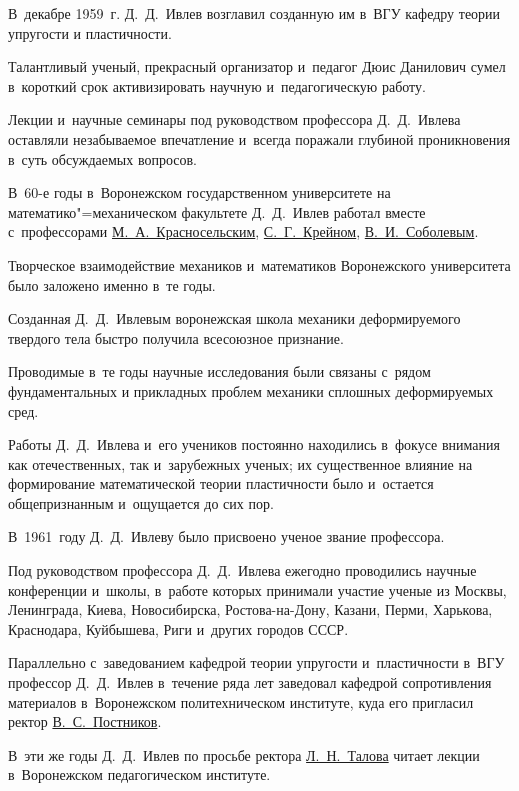 В~декабре 1959~г. Д.~Д.~Ивлев возглавил созданную им в~ВГУ кафедру теории упругости и пластичности. 

Талантливый ученый, прекрасный организатор и~педагог Дюис Данилович сумел в~короткий срок активизировать научную и~педагогическую работу. 

Лекции и~научные семинары под руководством профессора Д.~Д.~Ивлева оставляли незабываемое впечатление и~всегда поражали глубиной проникновения в~суть обсуждаемых вопросов. 

В~60-е годы в~Воронежском государственном университете на математико"=механическом факультете Д.~Д.~Ивлев работал вместе с~профессорами \href{https://goo.gl/gmkFPO}{М.~А.~Красносельским}, \href{https://goo.gl/ZUJ4FA}{С.~Г.~Крейном}, \href{https://goo.gl/JwF5q2}{В.~И.~Соболевым}. 

Творческое взаимодействие механиков и~математиков Воронежского университета было заложено именно в~те годы. 

Созданная Д.~Д.~Ивлевым воронежская школа механики деформируемого твердого тела быстро получила всесоюзное признание. 

Проводимые в~те годы научные исследования были связаны с~рядом фундаментальных и прикладных проблем механики сплошных деформируемых сред. 

Работы Д.~Д.~Ивлева и~его учеников постоянно находились в~фокусе внимания  как отечественных, так и~зарубежных ученых; их существенное влияние на формирование математической теории пластичности было и~остается общепризнанным и~ощущается до сих пор. 

В~1961~году Д.~Д.~Ивлеву было присвоено ученое звание профессора. 

Под руководством профессора Д.~Д.~Ивлева ежегодно проводились научные конференции и~школы, в~работе которых принимали участие ученые из Москвы, Ленинграда, Киева, Новосибирска, Ростова-на-Дону, Казани, Перми, Харькова, Краснодара, Куйбышева, Риги и~других городов СССР.



Параллельно с~заведованием кафедрой теории упругости и~пластичности в~ВГУ профессор Д.~Д.~Ивлев в~течение ряда лет заведовал кафедрой сопротивления материалов в~Воронежском политехническом институте, куда его пригласил ректор \href{www.mathnet.ru/php/person.phtml?personid=111122}{В.~С.~Постников}. 

В~эти же годы Д.~Д.~Ивлев по просьбе ректора \href{http://www.vspu.ac.ru/news/detail/1646}{Л.~Н.~Талова} читает лекции в~Воронежском педагогическом институте. 

